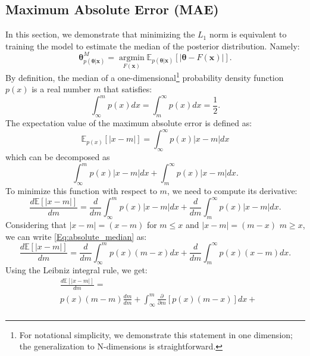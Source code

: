 \documentclass{aa}
\begin{document}
\begin{appendix}
\section{Maximum Absolute Error (MAE)}\label{Sec:appendix_Maximum Absolute Error}
In this section, we demonstrate that minimizing the $L_1$ norm is equivalent to training the model to estimate the median of the posterior distribution.
Namely:
\begin{equation}\label{Eq:median_mae}
 \bm {\theta}^M_{p(\bm {\theta}|\bm{x})}=\operatorname*{argmin}_{F(\bm{x})}\mathbb{E}_{p(\bm {\theta}|\bm {x})}[| \bm {\theta}-F(\bm{x})|].
\end{equation}
By definition, the median of a one-dimensional\footnote{For notational simplicity, we demonstrate this statement in one dimension; the generalization to N-dimensions is straightforward.} probability density function $p(x)$ is a real number $m$ that satisfies:
\begin{equation}\label{Eq:definition_median}
\int_{\infty}^{m} p(x)dx=\int_{m}^{\infty}p(x)dx=\frac{1}{2}.
\end{equation}
The expectation value of the maximum absolute error is defined as:
\begin{equation}
    \mathbb{E}_{p(x)}[|x-m|]= \int_{\infty}^{\infty}p(x)|x-m|dx  
\end{equation}
which can be decomposed as
\begin{equation}
        \int_{\infty}^{m}p(x)|x-m|dx +\int_{m}^{\infty}p(x)|x-m|dx .
\end{equation}
To minimize this function with respect to $m$, we need to compute its derivative:
\begin{equation}\label{Eq:absolute_median}
    \frac{d\mathbb{E}[|x-m|]}{dm}=
    \frac{d}{dm}\int_{\infty}^{m}p(x)|x-m|dx +\frac{d}{dm}\int_{m}^{\infty}p(x)|x-m|dx. 
\end{equation}
Considering that $|x-m|=(x-m)$ for $m\le x$ and $|x-m|=(m-x)$ $m\ge x$, 
we can write \autoref{Eq:absolute_median} as:
\begin{equation}
    \frac{d\mathbb{E}[|x-m|]}{dm}=
    \frac{d}{dm}\int_{\infty}^{m}p(x)(m-x)dx +\frac{d}{dm}\int_{m}^{\infty}p(x)(x-m)dx .
\end{equation}
Using the Leibniz integral rule, we get:
\begin{align}
    &\frac{d\mathbb{E}[|x-m|]}{dm}= \\
    &
    p(x)(m-m)\frac{dm}{dm}+\int_{\infty}^{m}\frac{\partial}{\partial m}[p(x)(m-x)]dx + \nonumber \\

\end{align}
\end{appendix}
\end{document}

